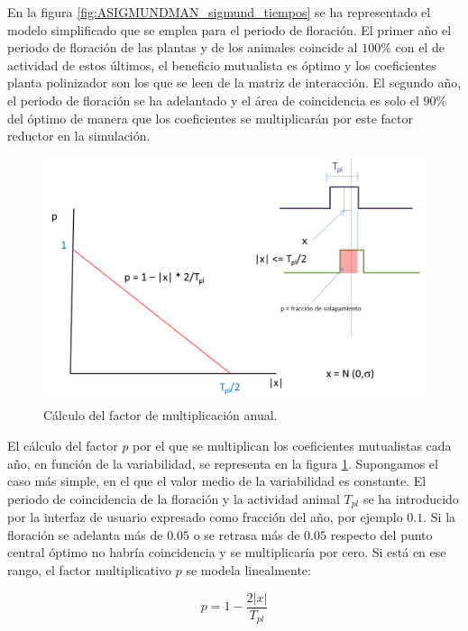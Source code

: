 En la figura \ref{fig:ASIGMUNDMAN_sigmund_tiempos} se ha representado el modelo simplificado que se emplea para el periodo de floración. El primer año el periodo de floración de las
plantas y de los animales coincide al $100\%$ con el de actividad de estos últimos, el beneficio mutualista es óptimo y los coeficientes planta polinizador son los que se leen de la
matriz de interacción. El segundo año, el periodo de floración se ha adelantado y el área de coincidencia es solo el $90\%$ del óptimo de manera que los coeficientes se multiplicarán por este factor reductor en la simulación.

\begin{figure}[h!]
\centering
\includegraphics[scale=1]{ManFigs/sigmund_pendiente.png}
\caption{Cálculo del factor de multiplicación anual.}
\label{fig:ASIGMUNDMAN_sigmund_pendiente}
\end{figure}

El cálculo del factor $p$ por el que se multiplican los coeficientes mutualistas cada año, en función de la variabilidad, se representa en la figura \ref{fig:ASIGMUNDMAN_sigmund_pendiente}. Supongamos el caso más simple, en el que el valor medio de la variabilidad es constante. El periodo de coincidencia de la floración y la actividad animal $T_{pl}$ se ha introducido por la interfaz de usuario expresado como fracción del año, por ejemplo $0.1$. Si la floración se adelanta más de $0.05$ o se retrasa más de $0.05$ respecto del punto central óptimo no habría coincidencia y se multiplicaría por cero. Si está en ese rango, el factor multiplicativo $p$ se modela linealmente:

\begin{equation}
p = 1 - \frac{2|x|}{T_{pl}}
\label{eq:sigmund_p}
\end{equation}


